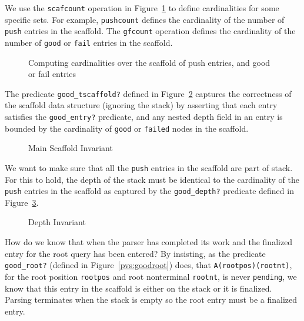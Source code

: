 \documentclass[sigplan,10pt,anonymous,review]{acmart}\settopmatter{printfolios=true,printccs=false,printacmref=false}
\begin{document}
\begin{CCSXML}
We use the \texttt{scafcount} operation in Figure~\ref{pvs:gfcount}
to define cardinalities
for some specific sets.  For example, \texttt{pushcount} defines the
cardinality of the number of \texttt{push} entries in the scaffold.
The \texttt{gfcount} operation defines the cardinality of the number
of \texttt{good} or \texttt{fail} entries in the scaffold.

\begin{figure}[h!]
  
    \vspace*{-4mm}
\caption{\small Computing cardinalities over the scaffold of push entries, and good or fail entries}
\label{pvs:gfcount}
\end{figure}

The predicate \texttt{good\_tscaffold?} defined in Figure~\ref{pvs:goodtscaffold}
captures the correctness of the scaffold
data structure (ignoring the stack) by asserting that each  entry
satisfies the \texttt{good\_entry?} predicate, and any nested depth field
in an entry is bounded by the cardinality of \texttt{good} or \texttt{failed} nodes in the scaffold.  
\begin{figure}[h!]
  
    \vspace*{-4mm}
\caption{\small Main Scaffold Invariant}
\label{pvs:goodtscaffold}
\end{figure}

  We want to make sure that all the   \texttt{push} entries in the scaffold are part of stack.  For this to hold, the depth of the stack must be identical to the cardinality of the \texttt{push} entries in the scaffold as captured by the \texttt{good\_depth?} predicate defined in Figure~\ref{pvs:gooddepth}.

\begin{figure}[h!]
  
    \vspace*{-4mm}
\caption{\small Depth Invariant}
\label{pvs:gooddepth}
\end{figure}

How do we know that when the parser has completed its work and the finalized entry
for the root query has been entered?  By insisting, as the predicate
\texttt{good\_root?} (defined in Figure~\ref{pvs:goodroot})
does, that \texttt{A(rootpos)(rootnt)}, for
the root position \texttt{rootpos} and root nonterminal \texttt{rootnt},
is never \texttt{pending}, we know that this entry in the scaffold is either on the stack or it is finalized.  Parsing terminates when the stack is empty so the
root entry must be a finalized entry.  


\end{CCSXML}
\end{document}
